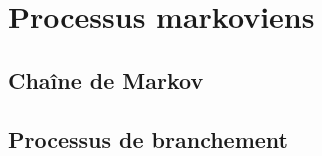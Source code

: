 \section{Processus markoviens} 
\newcommand{\probas}{/home/robin/ENSEIGN/Cours/MathBiologie/L3-ENS-Math1/Exercices/Probas}

\subsection{Chaîne de Markov}



\subsection{Processus de branchement}





